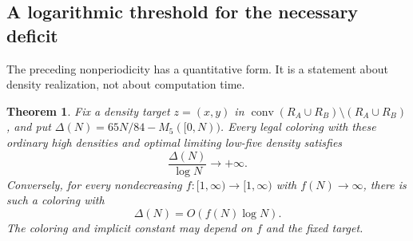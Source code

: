 \documentclass[11pt,reqno]{amsart}
\theoremstyle{plain}
\newtheorem{theorem}{Theorem}
\theoremstyle{plain}
\theoremstyle{plain}
\begin{document}
\subsection{A logarithmic threshold for the necessary deficit}

The preceding nonperiodicity has a quantitative form. It is a statement
about density realization, not about computation time.

\begin{theorem}\label{M-thm:component-deficit-rate}
Fix a density target $z=(x,y)$ in
$\operatorname{conv}(R_A\cup R_B)\setminus(R_A\cup R_B)$, and put
$\Delta(N)=65N/84-M_5([0,N))$.
Every legal coloring with these ordinary high densities and optimal
limiting low-five density satisfies
\[
 \frac{\Delta(N)}{\log N}\longrightarrow+\infty.
\]
Conversely, for every nondecreasing $f:[1,\infty)\to[1,\infty)$
with $f(N)\to\infty$, there is such a coloring with
\[
 \Delta(N)=O(f(N)\log N).
\]
The coloring and implicit constant may depend on $f$ and the fixed target.
\end{theorem}
\end{document}
